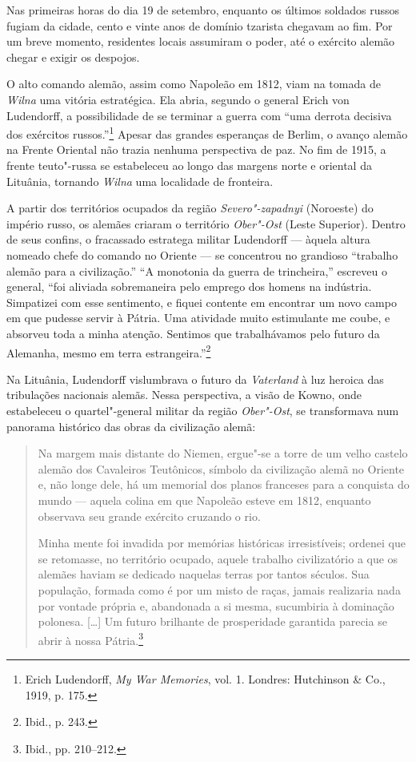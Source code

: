 Nas primeiras horas do dia 19 de setembro, enquanto os últimos soldados
russos fugiam da cidade, cento e vinte anos de domínio tzarista chegavam
ao fim. Por um breve momento, residentes locais assumiram o poder, até o
exército alemão chegar e exigir os despojos.

O alto comando alemão, assim como Napoleão em 1812, viam na tomada de
\textit{Wilna} uma vitória estratégica. Ela abria, segundo o general Erich von
Ludendorff, a possibilidade de se terminar a guerra com ``uma derrota
decisiva dos exércitos russos.''\footnote{Erich Ludendorff, \textit{My War Memories}, vol. 1. Londres: Hutchinson \& Co., 1919, p. 175.} Apesar das grandes esperanças de Berlim, o avanço alemão na Frente Oriental não
trazia nenhuma perspectiva de paz. No fim de 1915, a frente teuto"-russa
se estabeleceu ao longo das margens norte e oriental da Lituânia,
tornando \textit{Wilna} uma localidade de fronteira.

A partir dos territórios ocupados da região \textit{Severo"-zapadnyi}
(Noroeste) do império russo, os alemães criaram o território
\textit{Ober"-Ost} (Leste Superior). Dentro de seus confins, o fracassado
estratega militar Ludendorff --- àquela altura nomeado chefe do comando no
Oriente --- se concentrou no grandioso ``trabalho alemão para a
civilização.'' ``A monotonia da guerra de trincheira,'' escreveu o
general, ``foi aliviada sobremaneira pelo emprego dos homens na
indústria. Simpatizei com esse sentimento, e fiquei contente em
encontrar um novo campo em que pudesse servir à Pátria. Uma atividade
muito estimulante me coube, e absorveu toda a minha atenção. Sentimos
que trabalhávamos pelo futuro da Alemanha, mesmo em terra
estrangeira.''\footnote{Ibid., p. 243.}

Na Lituânia, Ludendorff vislumbrava o futuro da \textit{Vaterland} à luz
heroica das tribulações nacionais alemãs. Nessa perspectiva, a visão de
Kowno, onde estabeleceu o quartel"-general militar da região
\textit{Ober"-Ost}, se transformava num panorama histórico das obras da
civilização alemã:

\begin{quote}
Na margem mais distante do Niemen, ergue"-se a torre de um velho castelo
alemão dos Cavaleiros Teutônicos, símbolo da civilização alemã no
Oriente e, não longe dele, há um memorial dos planos franceses para a
conquista do mundo --- aquela colina em que Napoleão esteve em 1812,
enquanto observava seu grande exército cruzando o rio.

Minha mente foi invadida por memórias históricas irresistíveis; ordenei
que se retomasse, no território ocupado, aquele trabalho civilizatório a
que os alemães haviam se dedicado naquelas terras por tantos séculos.
Sua população, formada como é por um misto de raças, jamais realizaria
nada por vontade própria e, abandonada a si mesma, sucumbiria à
dominação polonesa. [\ldots{}] Um futuro brilhante de prosperidade
garantida parecia se abrir à nossa Pátria.\footnote{Ibid., pp. 210--212.}
\end{quote}

